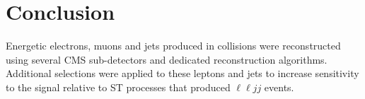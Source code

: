 \section{Conclusion}
\label{sec:recoConclusion}
Energetic electrons, muons and jets produced in collisions were reconstructed using several CMS sub-detectors 
and dedicated reconstruction algorithms.  Additional selections were applied to these leptons and jets to 
increase sensitivity to the \WR signal relative to ST processes that produced $\ell\ell jj$ events.

